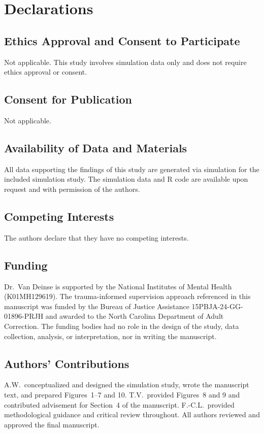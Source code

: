 \documentclass{article}[11pt]
\providecommand{\DIFaddend}{} %
\DeclareRobustCommand{\DIFaddend}{\DIFOaddend \let\includegraphics\DIFOincludegraphics} %
\begin{document}
\DIFaddend %
\section*{Declarations}

\subsection*{Ethics Approval and Consent to Participate}
Not applicable. This study involves simulation data only and does not require ethics approval or consent.

\subsection*{Consent for Publication}
Not applicable.

\subsection*{Availability of Data and Materials}
All data supporting the findings of this study are generated via simulation for the included simulation study. The simulation data and R code are available upon request and with permission of the authors.

\subsection*{Competing Interests}
The authors declare that they have no competing interests.

\subsection*{Funding}
Dr.\ Van Deinse is supported by the National Institutes of Mental Health (K01MH129619). The trauma-informed supervision approach referenced in this manuscript was funded by the Bureau of Justice Assistance 15PBJA-24-GG-01896-PRJH and awarded to the North Carolina Department of Adult Correction. The funding bodies had no role in the design of the study, data collection, analysis, or interpretation, nor in writing the manuscript.

\subsection*{Authors' Contributions}
A.W.\ conceptualized and designed the simulation study, wrote the manuscript text, and prepared Figures~1--7 and 10. T.V.\ provided Figures~8 and 9 and contributed advisement for Section~4 of the manuscript. F.-C.L.\ provided methodological guidance and critical review throughout. All authors reviewed and approved the final manuscript.
\end{document}
